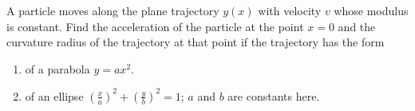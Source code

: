 
\item A particle moves along the plane trajectory \(y(x)\) with velocity \(v\) whose modulus is constant. Find the acceleration of the particle at the point \(x = 0\) and the curvature radius of the trajectory at that point if the trajectory has the form
    \begin{enumerate}
        \item of a parabola \(y = ax^2\).
        \item of an ellipse \(\left(\frac{x}{a}\right)^2 + \left(\frac{y}{b}\right)^2 = 1\); \(a\) and \(b\) are constants here.
    \end{enumerate}
